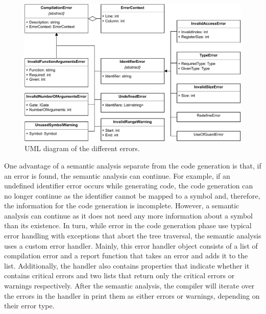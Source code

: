 \begin{figure}[htp]
    \centering
    \includegraphics[width=.9\textwidth]{../figures/drawio/uml_errors.pdf}
    \caption{UML diagram of the different errors.}
    \label{fig:implementation_uml_errors}
\end{figure}

One advantage of a semantic analysis separate from the code generation is that, if an error is found, the semantic analysis can continue. For example, if an undefined identifier error occurs while generating code, the code generation can no longer continue as the identifier cannot be mapped to a symbol and, therefore, the information for the code generation is incomplete. However, a semantic analysis can continue as it does not need any more information about a symbol than its existence. In turn, while error in the code generation phase use typical error handling with exceptions that abort the tree traversal, the semantic analysis uses a custom error handler. Mainly, this error handler object consists of a list of compilation error and a report function that takes an error and adds it to the list. Additionally, the handler also contains properties that indicate whether it contains critical errors and two lists that return only the critical errors or warnings respectively. After the semantic analysis, the compiler will iterate over the errors in the handler in print them as either errors or warnings, depending on their error type.
